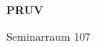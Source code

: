 \documentclass[a4paper]{article}
\begin{document}
\printGenericVSLHeader
\begin{center}
\begin{vsltext}{3cm}{4cm}

   \vspace{0.5cm} 

    \textbf{PRUV} 

    \vspace{1.5cm}

    Seminarraum 107

\end{vsltext}

\end{center}
\end{document}
